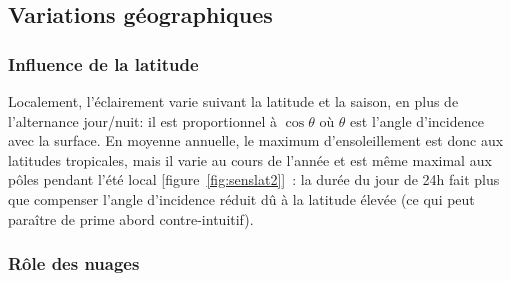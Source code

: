 
\sk
\subsection{Variations géographiques}

\sk
\subsubsection{Influence de la latitude}

\sk
Localement, l'éclairement varie suivant la latitude et la saison, en plus de l'alternance jour/nuit: il est proportionnel à $\cos\theta$ où $\theta$ est l'angle d'incidence avec la surface.
En moyenne annuelle, le maximum d'ensoleillement est donc aux latitudes tropicales, mais il varie au cours de l'année et est même maximal aux pôles pendant l'été local [figure~\ref{fig:senslat2}]~: la durée du jour de 24h fait plus que compenser l'angle d'incidence réduit dû à la latitude élevée (ce qui peut paraître de prime abord contre-intuitif).

\sk
\subsubsection{Rôle des nuages}

